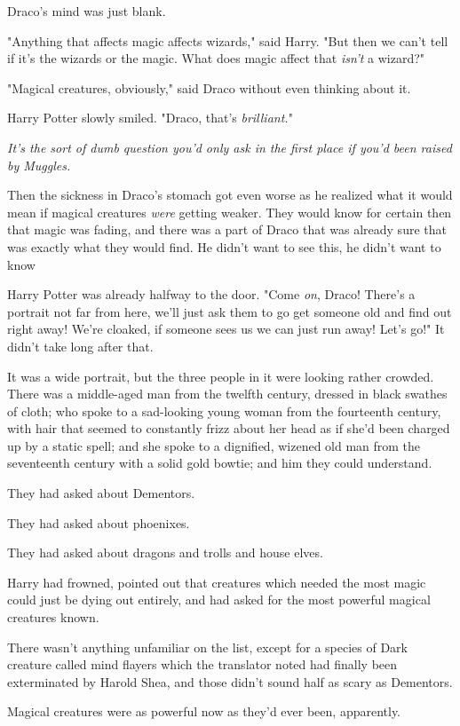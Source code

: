 Draco's mind was just blank.

"Anything that affects magic affects wizards," said Harry. "But then we can't
tell if it's the wizards or the magic. What does magic affect that \emph{isn't}
a wizard?"

"Magical creatures, obviously," said Draco without even thinking about it.

Harry Potter slowly smiled. "Draco, that's \emph{brilliant.}"

\emph{It's the sort of dumb question you'd only ask in the first place if you'd
been raised by Muggles.}

Then the sickness in Draco's stomach got even worse as he realized what it
would mean if magical creatures \emph{were} getting weaker. They would know for
certain then that magic was fading, and there was a part of Draco that was
already sure that was exactly what they would find. He didn't want to see this,
he didn't want to know{\el}

Harry Potter was already halfway to the door. "Come \emph{on}, Draco! There's a
portrait not far from here, we'll just ask them to go get someone old and find
out right away! We're cloaked, if someone sees us we can just run away! Let's
go!"
\sbreak
It didn't take long after that.

It was a wide portrait, but the three people in it were looking rather crowded.
There was a middle-aged man from the twelfth century, dressed in black swathes
of cloth; who spoke to a sad-looking young woman from the fourteenth century,
with hair that seemed to constantly frizz about her head as if she'd been
charged up by a static spell; and she spoke to a dignified, wizened old man
from the seventeenth century with a solid gold bowtie; and him they could
understand.

They had asked about Dementors.

They had asked about phoenixes.

They had asked about dragons and trolls and house elves.

Harry had frowned, pointed out that creatures which needed the most magic could
just be dying out entirely, and had asked for the most powerful magical
creatures known.

There wasn't anything unfamiliar on the list, except for a species of Dark
creature called mind flayers which the translator noted had finally been
exterminated by Harold Shea, and those didn't sound half as scary as Dementors.

Magical creatures were as powerful now as they'd ever been, apparently.

